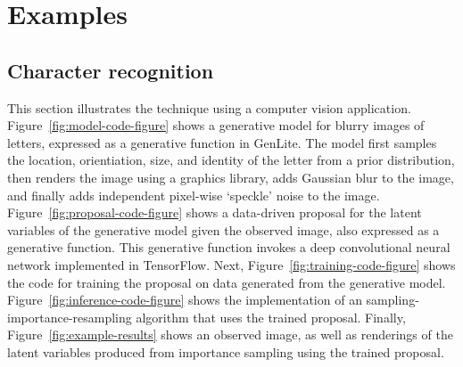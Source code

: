 \section{Examples}

\subsection{Character recognition}
This section illustrates the technique using a computer vision application.
Figure~\ref{fig:model-code-figure} shows a generative model for blurry images of letters, expressed as a generative function in GenLite.
The model first samples the location, orientiation, size, and identity of the letter from a prior distribution, then renders the image using a graphics library, adds Gaussian blur to the image, and finally adds independent pixel-wise `speckle' noise to the image.
Figure~\ref{fig:proposal-code-figure} shows a data-driven proposal for the latent variables of the generative model given the observed image, also expressed as a generative function.
This generative function invokes a deep convolutional neural network implemented in TensorFlow.
Next, Figure~\ref{fig:training-code-figure} shows the code for training the proposal on data generated from the generative model.
Figure~\ref{fig:inference-code-figure} shows the implementation of an sampling-importance-resampling algorithm that uses the trained proposal.
Finally, Figure~\ref{fig:example-results} shows an observed image, as well as renderings of the latent variables produced from importance sampling using the trained proposal.

